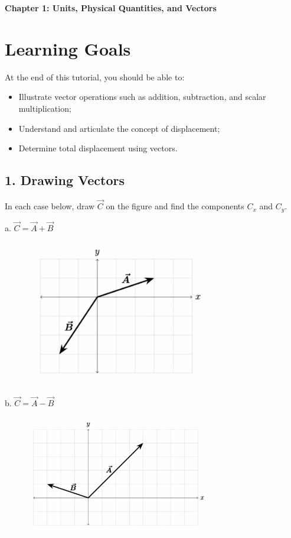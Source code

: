 \documentclass{article}
\begin{document}
\Large
\begin{centering} \textbf{Chapter 1: Units, Physical Quantities, and Vectors}

\end{centering}

\section*{Learning Goals}
\large
At the end of this tutorial, you should be able to:
\begin{itemize}
    \item Illustrate vector operations such as addition, subtraction, and scalar multiplication;
    \item Understand and articulate the concept of displacement;
    \item Determine total displacement using vectors.
    
\end{itemize}

\hline \vspace{0.5cm}

\subsection*{1. Drawing Vectors}
In each case below, draw $\vec{C}$ on the figure and find the components $C_x$ and $C_y$.
\newline \vspace{0.5cm}

\noindent a. $\vec{C} = \vec{A} + \vec{B}$
\begin{figure}[h!]
    \centering
    \includegraphics[width=8cm]{case1.png}
\end{figure}

\newpage

\noindent b. $\vec{C} = \vec{A} - \vec{B}$
\begin{figure}[h!]
    \centering
    \includegraphics[width=8cm]{case2.png}
\end{figure}
\end{document}

